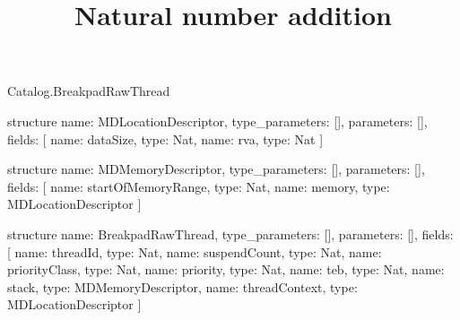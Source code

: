 \begin{lexlean}{Catalog.BreakpadRawThread}
\title{Natural number addition}
\begin{semanticmodule}
structure{
  name: MDLocationDescriptor,
  type_parameters: [],
  parameters: [],
  fields: [
    {name: dataSize, type: Nat},
    {name: rva, type: Nat}
  ]
}

structure{
  name: MDMemoryDescriptor,
  type_parameters: [],
  parameters: [],
  fields: [
    {name: startOfMemoryRange, type: Nat},
    {name: memory, type: MDLocationDescriptor}
  ]
}

structure{
  name: BreakpadRawThread,
  type_parameters: [],
  parameters: [],
  fields: [
    {name: threadId, type: Nat},
    {name: suspendCount, type: Nat},
    {name: priorityClass, type: Nat},
    {name: priority, type: Nat},
    {name: teb, type: Nat},
    {name: stack, type: MDMemoryDescriptor},
    {name: threadContext, type: MDLocationDescriptor}
  ]
}
\end{semanticmodule}
\end{lexlean}
